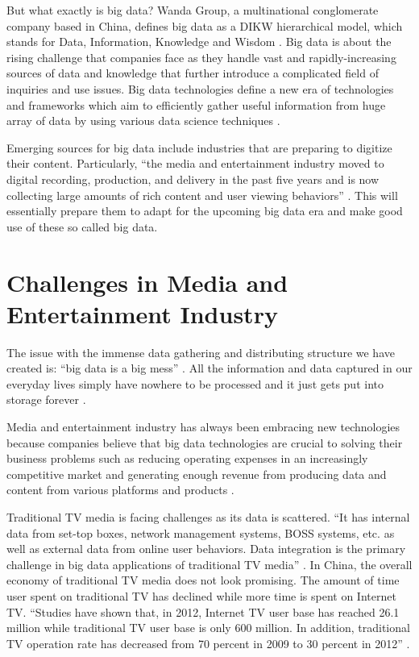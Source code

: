 But what exactly is big data? Wanda Group, a multinational conglomerate company based in China, defines big data as a DIKW hierarchical model, which stands for Data, Information, Knowledge and Wisdom \cite{Zhang2017era}. Big data is about the rising challenge that companies face as they handle vast and rapidly-increasing sources of data and knowledge that further introduce a complicated field of inquiries and use issues. Big data technologies define a new era of technologies and frameworks which aim to efficiently gather useful information from huge array of data by using various data science techniques \cite{Villars2011care}.

Emerging sources for big data include industries that are preparing to digitize their content. Particularly, ``the media and entertainment industry moved to digital recording, production, and delivery in the past five years and is now collecting large amounts of rich content and user viewing behaviors'' \cite{Villars2011care}. This will essentially prepare them to adapt for the upcoming big data era and make good use of these so called big data. 

\section{Challenges in Media and Entertainment Industry}

The issue with the immense data gathering and distributing structure we have created is: ``big data is a big mess'' \cite{Schlieski2012data}. All the information and data captured in our everyday lives simply have nowhere to be processed and it just gets put into storage forever \cite{Schlieski2012data}.

Media and entertainment industry has always been embracing new technologies because companies believe that big data technologies are crucial to solving their business problems such as reducing operating expenses in an increasingly competitive market and generating enough revenue from producing data and content from various platforms and products \cite{Lippell2016sectors}.

Traditional TV media is facing challenges as its data is scattered. ``It has internal data from set-top boxes, network management systems, BOSS systems, etc. as well as external data from online user behaviors. Data integration is the primary challenge in big data applications of traditional TV media'' \cite{Zhang2017era}. In China, the overall economy of traditional TV media does not look promising. The amount of time user spent on traditional TV has declined while more time is spent on Internet TV. ``Studies have shown that, in 2012, Internet TV user base has reached 26.1 million while traditional TV user base is only 600 million. In addition, traditional TV operation rate has decreased from 70 percent in 2009 to 30 percent in 2012'' \cite{Zhang2017era}.

